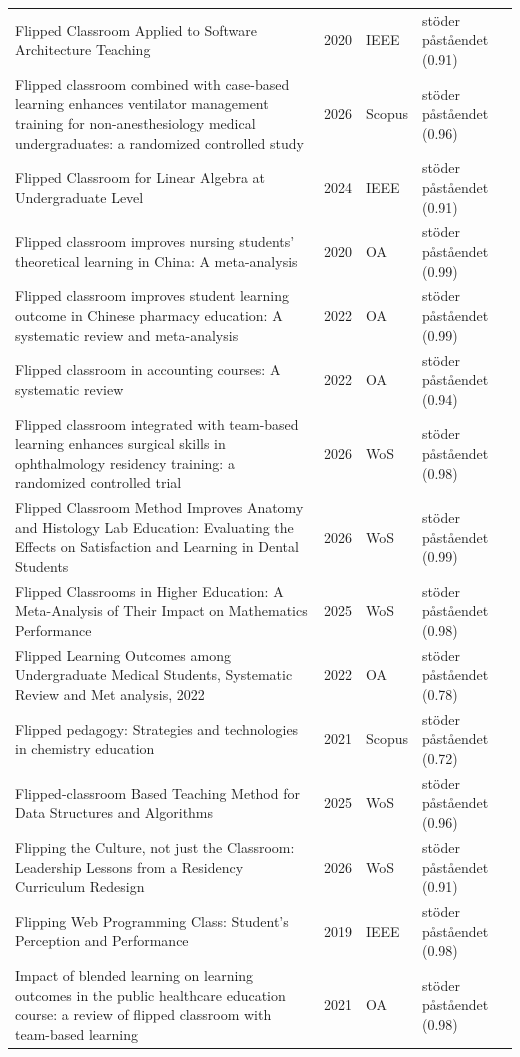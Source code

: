 \begin{longtable}{@{}%
  >{\raggedright\arraybackslash}p{}c%
  >{\raggedright\arraybackslash}p{}%
  >{\raggedright\arraybackslash}p{}@{}}
Flipped Classroom Applied to Software Architecture Teaching & 2020 & IEEE & stöder påståendet (0.91) \\
Flipped classroom combined with case-based learning enhances ventilator management training for non-anesthesiology medical undergraduates: a randomized controlled study & 2026 & Scopus & stöder påståendet (0.96) \\
Flipped Classroom for Linear Algebra at Undergraduate Level & 2024 & IEEE & stöder påståendet (0.91) \\
Flipped classroom improves nursing students' theoretical learning in China: A meta-analysis & 2020 & OA & stöder påståendet (0.99) \\
Flipped classroom improves student learning outcome in Chinese pharmacy education: A systematic review and meta-analysis & 2022 & OA & stöder påståendet (0.99) \\
Flipped classroom in accounting courses: A systematic review & 2022 & OA & stöder påståendet (0.94) \\
Flipped classroom integrated with team-based learning enhances surgical skills in ophthalmology residency training: a randomized controlled trial & 2026 & WoS & stöder påståendet (0.98) \\
Flipped Classroom Method Improves Anatomy and Histology Lab Education: Evaluating the Effects on Satisfaction and Learning in Dental Students & 2026 & WoS & stöder påståendet (0.99) \\
Flipped Classrooms in Higher Education: A Meta-Analysis of Their Impact on Mathematics Performance & 2025 & WoS & stöder påståendet (0.98) \\
Flipped Learning Outcomes among Undergraduate Medical Students, Systematic Review and Met analysis, 2022 & 2022 & OA & stöder påståendet (0.78) \\
Flipped pedagogy: Strategies and technologies in chemistry education & 2021 & Scopus & stöder påståendet (0.72) \\
Flipped-classroom Based Teaching Method for Data Structures and Algorithms & 2025 & WoS & stöder påståendet (0.96) \\
Flipping the Culture, not just the Classroom: Leadership Lessons from a Residency Curriculum Redesign & 2026 & WoS & stöder påståendet (0.91) \\
Flipping Web Programming Class: Student's Perception and Performance & 2019 & IEEE & stöder påståendet (0.98) \\
Impact of blended learning on learning outcomes in the public healthcare education course: a review of flipped classroom with team-based learning & 2021 & OA & stöder påståendet (0.98) \\

\end{longtable}
